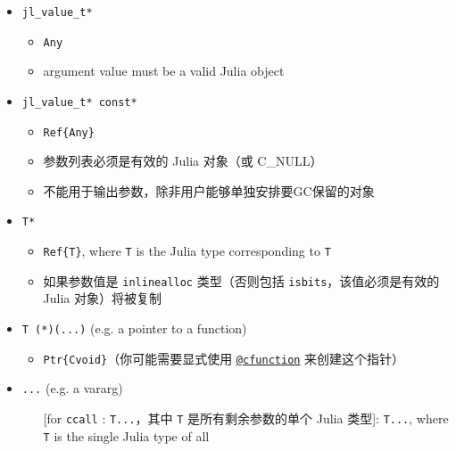 \begin{itemize}
\begin{itemize}
\end{itemize}

\item \texttt{jl\_value\_t*}

\begin{itemize}
\item \texttt{Any}


\item argument value must be a valid Julia object

\end{itemize}

\item \texttt{jl\_value\_t* const*}

\begin{itemize}
\item \texttt{Ref\{Any\}}


\item 参数列表必须是有效的 Julia 对象（或 C\_NULL）


\item 不能用于输出参数，除非用户能够单独安排要GC保留的对象

\end{itemize}

\item \texttt{T*}

\begin{itemize}
\item \texttt{Ref\{T\}}, where \texttt{T} is the Julia type corresponding to \texttt{T}


\item 如果参数值是 \texttt{inlinealloc} 类型（否则包括 \texttt{isbits}，该值必须是有效的 Julia 对象）将被复制

\end{itemize}

\item \texttt{T (*)(...)} (e.g. a pointer to a function)

\begin{itemize}
\item \texttt{Ptr\{Cvoid\}}（你可能需要显式使用 \hyperlink{11617107520401351255}{\texttt{@cfunction}} 来创建这个指针）

\end{itemize}

\item \texttt{...} (e.g. a vararg)

\begin{itemize}
\item [[for \texttt{ccall}]: \texttt{T...}，其中 \texttt{T} 是所有剩余参数的单个 Julia 类型]: \texttt{T...}, where \texttt{T} is the single Julia type of all



\end{itemize}
\end{itemize}
